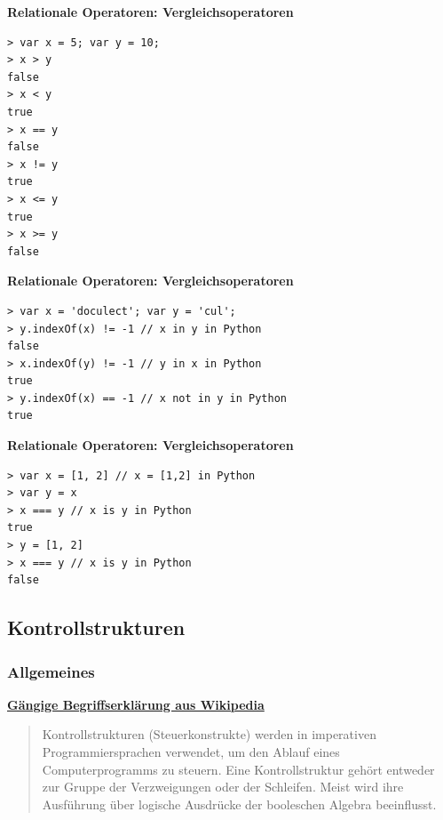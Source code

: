 \vspace{0.5cm}\par\noindent\textbf{Relationale Operatoren: Vergleichsoperatoren}\vspace{0.5cm}

\begin{verbatim}
> var x = 5; var y = 10;
> x > y
false
> x < y
true
> x == y
false
> x != y
true
> x <= y
true
> x >= y
false
\end{verbatim}




\vspace{0.5cm}\par\noindent\textbf{Relationale Operatoren: Vergleichsoperatoren}\vspace{0.5cm}

\begin{verbatim}
> var x = 'doculect'; var y = 'cul';
> y.indexOf(x) != -1 // x in y in Python
false
> x.indexOf(y) != -1 // y in x in Python
true
> y.indexOf(x) == -1 // x not in y in Python
true
\end{verbatim}




\vspace{0.5cm}\par\noindent\textbf{Relationale Operatoren: Vergleichsoperatoren}\vspace{0.5cm}

\begin{verbatim}
> var x = [1, 2] // x = [1,2] in Python
> var y = x
> x === y // x is y in Python
true
> y = [1, 2] 
> x === y // x is y in Python
false
\end{verbatim}

\subsection{Kontrollstrukturen}

\subsubsection{Allgemeines}
\vspace{0.5cm}\par\noindent\textbf{\href{http://de.wikipedia.org/wiki/Kontrollstruktur}{Gängige\vspace{0.5cm}
Begriffserklärung aus Wikipedia}}

\begin{quote}
Kontrollstrukturen (Steuerkonstrukte) werden in imperativen
Programmiersprachen verwendet, um den Ablauf eines Computerprogramms zu
steuern. Eine Kontrollstruktur gehört entweder zur Gruppe der
Verzweigungen oder der Schleifen. Meist wird ihre Ausführung über
logische Ausdrücke der booleschen Algebra beeinflusst.
\end{quote}



